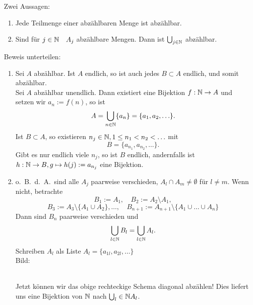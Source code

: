 \documentclass[../ana1.tex]{subfiles}
\begin{document}
\begin{satz}
	Zwei Aussagen:
	\begin{enumerate}
		\item Jede Teilmenge einer abzählbaren Menge ist abzählbar.
		\item Sind für \(j\in\mathbb{N} \quad A_j\) abzählbare Mengen. Dann ist \(\bigcup_{j\in\mathbb{N}}\) abzählbar.
	\end{enumerate}
\end{satz}
\begin{bew}
	Beweis unterteilen:
	\begin{enumerate}
		\item Sei \(A\) abzählbar. Ist \(A\) endlich, so ist auch jedes \(B\subset A\) endlich, und somit abzählbar.\\
		      Sei \(A\) abzählbar unendlich. Dann existiert eine Bijektion \(f: \mathbb{N} \rightarrow A\) und setzen wir \(a_n := f(n)\), so ist
		      \[ A = \bigcup_{n\in\mathbb{N}} \{a_n\} = \{a_1, a_2,\ldots \}.\]
			  Ist \(B\subset A\), so existieren \(n_j \in\mathbb{N}, 1\leq n_1<n_2<\ldots \) mit 
			  \[ B = \{a_{n_1}, a_{n_2}, \ldots \}.\]
		      Gibt es nur endlich viele \(n_j\), so ist \(B\) endlich, andernfalls ist \(h: \mathbb{N} \rightarrow B, g \mapsto h(j) := a_{n_j}\)
		      eine Bijektion.
		\item o.\ B.\ d.\ A.\ sind alle \(A_j\) paarweise verschieden, \(A_l \cap A_m \neq \emptyset \) für \(l\neq m\).
		      Wenn nicht, betrachte
		      \[ B_1 := A_1, \quad B_2 := A_2 \setminus A_1,\]
		      \[ B_3 := A_3 \setminus \{A_1 \cup A_2\}, \ldots, \quad B_{n+1} := A_{n+1} \setminus \{A_1\cup\ldots\cup A_n\} \]
		      Dann sind \(B_n\) paarweise verschieden und \[\bigcup_{l\in\mathbb{N}} B_l = \bigcup_{l\in\mathbb{N}} A_l.\]
		      Schreiben \(A_l\) als Liste \(A_l = \{a_{1l}, a_{2l}, \ldots \} \) \\
		      Bild:\\
		      \\Jetzt können wir das obige rechteckige Schema diagonal abzählen! Dies liefert uns eine Bijektion von \(\mathbb{N} \) nach \(\bigcup_l\in\mathbb{N} A_l\).
	\end{enumerate}
\end{bew}
\end{document}

